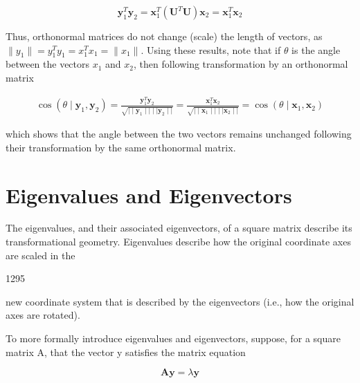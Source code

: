 \documentclass{article}
\begin{document}
\begin{equation}
\mathbf{y}_{1}^{T}\mathbf{y}_{2}=\mathbf{x}_{1}^{T}(\mathbf{U}^{T}\mathbf{U})\mathbf{x}_{2}=\mathbf{x}_{1}^{T}\mathbf{x}_{2}
\end{equation}

Thus, orthonormal matrices do not change (scale) the length of vectors, as  $ \|y_1\| = y_1^T y_1 = x_1^T x_1 = \|x_1\| $. Using these results, note that if  $ \theta $ is the angle between the vectors  $ x_1 $ and  $ x_2 $, then following transformation by an orthonormal matrix

\begin{equation}
\begin{align*}\cos(\theta\mid\mathbf{y}_1,\mathbf{y}_2)=\frac{\mathbf{y}_1^T\mathbf{y}_2}{\sqrt{\mid\mid\mathbf{y}_1\mid\mid\mid\mid\mathbf{y}_2\mid\mid}}=\frac{\mathbf{x}_1^T\mathbf{x}_2}{\sqrt{\mid\mid\mathbf{x}_1\mid\mid\mid\mid\mathbf{x}_2\mid\mid}}=\cos(\theta\mid\mathbf{x}_1,\mathbf{x}_2)\end{align*}
\end{equation}

which shows that the angle between the two vectors remains unchanged following their transformation by the same orthonormal matrix.

\section{Eigenvalues and Eigenvectors}
The eigenvalues, and their associated eigenvectors, of a square matrix describe its transformational geometry. Eigenvalues describe how the original coordinate axes are scaled in the

1295

new coordinate system that is described by the eigenvectors (i.e., how the original axes are rotated).

To more formally introduce eigenvalues and eigenvectors, suppose, for a square matrix A, that the vector y satisfies the matrix equation

\begin{equation}
\mathbf{A}\mathbf{y}=\lambda\mathbf{y}
\end{equation}
\end{document}
